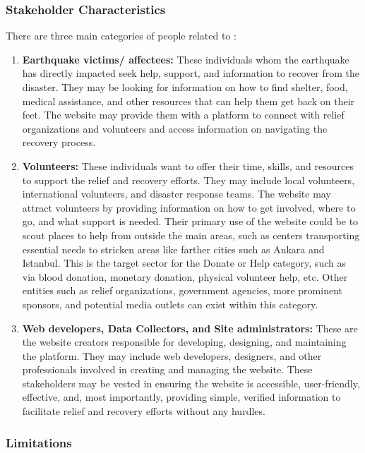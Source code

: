 \subsubsection{Stakeholder Characteristics}

There are three main categories of people related to \afetbilgi:
\begin{enumerate}
  \item \textbf{Earthquake victims/ affectees:} These individuals whom the earthquake has directly impacted seek help, support, and information to recover from the disaster. They may be looking for information on how to find shelter, food, medical assistance, and other resources that can help them get back on their feet. The website may provide them with a platform to connect with relief organizations and volunteers and access information on navigating the recovery process.
  \item \textbf{Volunteers:} These individuals want to offer their time, skills, and resources to support the relief and recovery efforts. They may include local volunteers, international volunteers, and disaster response teams. The website may attract volunteers by providing information on how to get involved, where to go, and what support is needed. Their primary use of the website could be to scout places to help from outside the main areas, such as centers transporting essential needs to stricken areas like farther cities such as Ankara and Istanbul. This is the target sector for the Donate or Help category, such as via blood donation, monetary donation, physical volunteer help, etc. Other entities such as relief organizations, government agencies, more prominent sponsors, and potential media outlets can exist within this category.
  \item \textbf{Web developers, Data Collectors, and Site administrators:} These are the website creators responsible for developing, designing, and maintaining the platform. They may include web developers, designers, and other professionals involved in creating and managing the website. These stakeholders may be vested in ensuring the website is accessible, user-friendly, effective, and, most importantly, providing simple, verified information to facilitate relief and recovery efforts without any hurdles.
\end{enumerate}

\subsubsection{Limitations}

